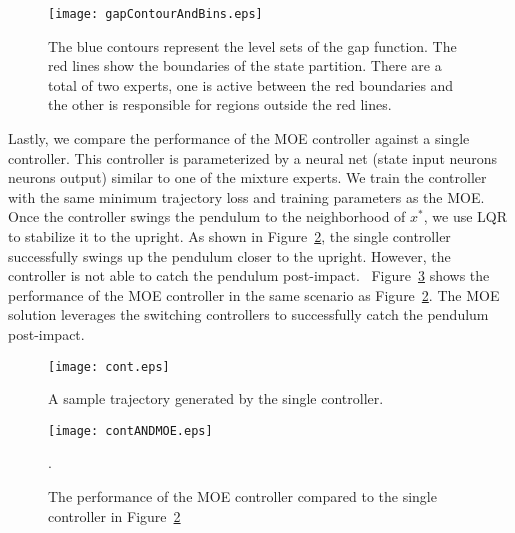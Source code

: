 \begin{figure}[H]
    \centering
    \texttt{[image: gapContourAndBins.eps]}
    \caption{The blue contours represent the level sets of the gap function. The red lines show the boundaries of the state partition. There are a total of two experts, one is active between the red boundaries and the other is responsible for regions outside the red lines.}
    \label{fig:gapContour}
\end{figure}


Lastly, we compare the performance of the MOE controller against a single controller.
%
This controller is parameterized by a neural net (state input 
neurons  neurons  output) similar to one of the
mixture experts.
%
We train the controller with the same minimum trajectory loss and training
parameters as the MOE.
%
Once the controller swings the pendulum to the neighborhood of $x^*$, we use LQR
to stabilize it to the upright.
%
As shown in Figure~\ref{fig:continuous_control}, the single controller
successfully swings up the pendulum closer to the upright.
%
However, the controller is not able to catch the pendulum post-impact.~
%
Figure~\ref{fig:contandmoe} shows the performance of the MOE controller in the
same scenario as Figure~\ref{fig:continuous_control}.
%
The MOE solution leverages the switching controllers to successfully catch the
pendulum post-impact.
%

\begin{figure}[t]
    \centering
    \texttt{[image: cont.eps]}
    \caption{A sample trajectory generated by the single controller. }
    \label{fig:continuous_control}
\end{figure}

\begin{figure}[H]
    \centering
    \texttt{[image: contANDMOE.eps]}
    \caption{The performance of the MOE controller compared to the single
    controller in Figure~\ref{fig:continuous_control}}.
    \label{fig:contandmoe}
\end{figure}
